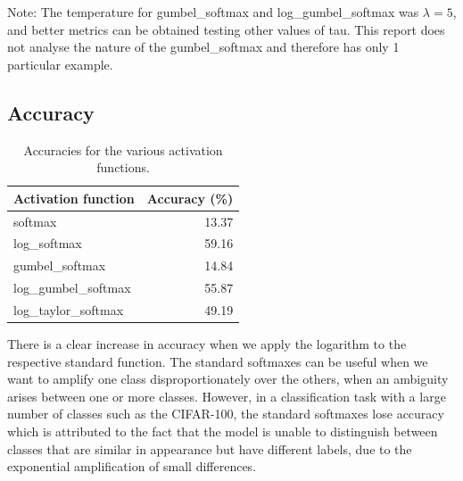 \documentclass{article}
\begin{document}
\noindent
Note: The temperature for gumbel\_softmax and log\_gumbel\_softmax was $\lambda =  5$, and better metrics can be obtained testing other values of tau. This report does not analyse the nature of the gumbel\_softmax and therefore has only 1 particular example.
\newpage
\subsection{Accuracy}

\begin{table}[h]
\centering
\begin{tabular}{l|r}
Activation function & Accuracy (\%) \\\hline
softmax & 13.37 \\
log\_softmax & 59.16 \\
gumbel\_softmax & 14.84 \\
log\_gumbel\_softmax & 55.87 \\
log\_taylor\_softmax & 49.19 
\end{tabular}
\caption{\label{tab:widgets}Accuracies for the various activation functions.}
\end{table}
\noindent
There is a clear increase in accuracy when we apply the logarithm to the respective standard function.
\newline
\newline
The standard softmaxes can be useful when we want to amplify one class disproportionately over the others, when an ambiguity arises between one or more classes. However, in a classification task with a large number of classes such as the CIFAR-100, the standard softmaxes lose accuracy which is attributed to the fact that the model is unable to distinguish between classes that are similar in appearance but have different labels, due to the exponential amplification of small differences.
\newline
\newline
\noindent
\end{document}
